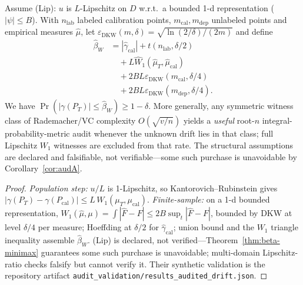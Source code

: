 \begin{theorem}\label{thm:short-audC}\label{thm:aud-C}
Assume \textup{(Lip)}: $u$ is $L$-Lipschitz on $D$ w.r.t.\ a bounded 1-d representation
($|\psi|\le B$). With $n_{\mathrm{lab}}$ labeled calibration points, $m_{\mathrm{cal}},
m_{\mathrm{dep}}$ unlabeled points and empirical measures $\widehat\mu$, let
$\varepsilon_{\mathrm{DKW}}(m,\delta)=\sqrt{\ln(2/\delta)/(2m)}$ and define
\begin{align*}
\widehat\beta_{W}
&=|\widehat\gamma_{\mathrm{cal}}|+t(n_{\mathrm{lab}},\delta/2)\\
&\quad+L\widehat W_1(\widehat\mu_T,\widehat\mu_{\mathrm{cal}})\\
&\quad+2BL\varepsilon_{\mathrm{DKW}}(m_{\mathrm{cal}},\delta/4)\\
&\quad+2BL\varepsilon_{\mathrm{DKW}}(m_{\mathrm{dep}},\delta/4).
\end{align*}
We have $\Pr(|\gamma(P_T)|\le\widehat\beta_{W})\ge1-\delta$.
More generally, any symmetric witness class of Rademacher/VC complexity $O(\sqrt{v/n})$ yields a
\emph{useful} root-$n$ integral-probability-metric audit whenever the unknown drift lies in that
class; full Lipschitz $W_1$ witnesses are excluded from that rate. The structural assumptions are
declared and falsifiable, not verifiable---some such purchase is unavoidable by
Corollary~\ref{cor:audA}.
\end{theorem}
\begin{proof}
\emph{Population step:} $u/L$ is 1-Lipschitz, so Kantorovich--Rubinstein gives
$|\gamma(P_T)-\gamma(P_{\mathrm{cal}})|\le L\,W_1(\mu_T,\mu_{\mathrm{cal}})$.
\emph{Finite-sample:} on a 1-d bounded representation,
$W_1(\widehat\mu,\mu)=\int|\widehat F-F|\le 2B\sup_t|\widehat F-F|$,
bounded by DKW at level $\delta/4$ per measure; Hoeffding at $\delta/2$ for
$\widehat\gamma_{\mathrm{cal}}$; union bound and the $W_1$ triangle inequality assemble
$\widehat\beta_W$. \textup{(Lip)} is declared, not verified---Theorem~\ref{thm:beta-minimax}
guarantees some such purchase is unavoidable; multi-domain Lipschitz-ratio checks falsify but
cannot verify it. Their synthetic validation is the repository artifact
\texttt{audit\_validation/results\_audited\_drift.json}.
\end{proof}


